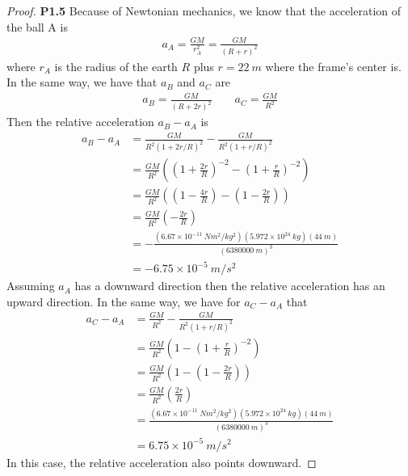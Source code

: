 \documentclass[11pt]{article}
\theoremstyle{definition}
\begin{document}
\begin{proof}{\textbf{P1.5}}
    Because of Newtonian mechanics, we know that the acceleration of the ball A
    is
    \begin{align*}
        a_A = \frac{GM}{r_A^2} = \frac{GM}{(R + r)^2}
    \end{align*}
    where $r_A$ is the radius of the earth $R$ plus $r = 22~m$ where the
    frame's center is. In the same way, we have that $a_B$ and $a_C$ are
    \begin{align*}
        a_B = \frac{GM}{(R + 2r)^2} \quad\quad a_C = \frac{GM}{R^2}
    \end{align*}
    Then the relative acceleration $a_B - a_A$ is
    \begin{align*}
        a_B - a_A &= \frac{GM}{R^2(1 + 2r/R)^2} - \frac{GM}{R^2(1 + r/R)^2}\\
            &= \frac{GM}{R^2}\left(\left(1 + \frac{2r}{R}\right)^{-2}
            - \left(1 + \frac{r}{R}\right)^{-2}\right)\\
            &= \frac{GM}{R^2}\left(\left(1 - \frac{4r}{R}\right)
            - \left(1 - \frac{2r}{R}\right)\right)\\
            &= \frac{GM}{R^2}\left(- \frac{2r}{R}\right)\\
            &= -\frac{(6.67 \times 10^{-11}~Nm^2/kg^2)(5.972\times10^{24}~kg)(44~m)}
            {(6380000~m)^3}\\
            &= -6.75 \times 10^{-5}~m/s^2
    \end{align*}
    Assuming $a_A$ has a downward direction then the relative acceleration
    has an upward direction.
    In the same way, we have for $a_C - a_A$ that
    \begin{align*}
        a_C - a_A &= \frac{GM}{R^2} - \frac{GM}{R^2(1 + r/R)^2}\\
            &= \frac{GM}{R^2}\left(1 - \left(1 + \frac{r}{R}\right)^{-2}\right)\\
            &= \frac{GM}{R^2}\left(1 - \left(1 - \frac{2r}{R}\right)\right)\\
            &= \frac{GM}{R^2}\left(\frac{2r}{R}\right)\\
            &= \frac{(6.67 \times 10^{-11}~Nm^2/kg^2)(5.972\times10^{24}~kg)(44~m)}
            {(6380000~m)^3}\\
            &= 6.75 \times 10^{-5}~m/s^2
    \end{align*}
    In this case, the relative acceleration also points downward.
\end{proof}
\end{document}
